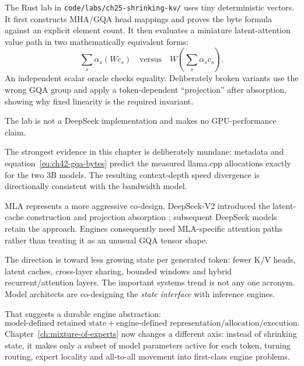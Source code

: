 
The Rust lab in \texttt{code/labs/ch25-shrinking-kv/} uses tiny deterministic vectors.
It first constructs MHA/GQA head mappings and proves the byte formula against an
explicit element count. It then evaluates a miniature latent-attention value path in
two mathematically equivalent forms:
\[
\sum_s\alpha_s(Wc_s)
\quad\text{versus}\quad
W\left(\sum_s\alpha_sc_s\right).
\]
An independent scalar oracle checks equality. Deliberately broken variants use the
wrong GQA group and apply a token-dependent ``projection'' after absorption, showing
why fixed linearity is the required invariant.

The lab is not a DeepSeek implementation and makes no GPU-performance claim.


The strongest evidence in this chapter is deliberately mundane: metadata and
equation~\eqref{eq:ch42-gqa-bytes} predict the measured llama.cpp allocations exactly
for the two 3B models. The resulting context-depth speed divergence is directionally
consistent with the bandwidth model.

MLA represents a more aggressive co-design. DeepSeek-V2 introduced the latent-cache
construction and projection absorption \cite{deepseek2024v2}; subsequent DeepSeek
models retain the approach. Engines consequently need MLA-specific attention paths
rather than treating it as an unusual GQA tensor shape.


The direction is toward less growing state per generated token: fewer K/V heads,
latent caches, cross-layer sharing, bounded windows and hybrid recurrent/attention
layers. The important systems trend is not any one acronym. Model architects are
co-designing the \emph{state interface} with inference engines.

That suggests a durable engine abstraction:
\[
\boxed{\text{model-defined retained state}+
\text{engine-defined representation/allocation/execution}.}
\]
Chapter~\ref{ch:mixture-of-experts} now changes a different axis: instead of shrinking
state, it makes only a subset of model parameters active for each token, turning
routing, expert locality and all-to-all movement into first-class engine problems.

